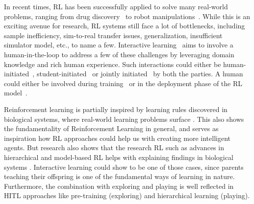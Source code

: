 \documentclass[twoside,11pt]{article}
\begin{document}
In recent times, RL has been successfully applied to solve many real-world problems, ranging from drug discovery~\citep{popova2018deep} to robot manipulations~\citep{nguyen2019review}. While this is an exciting avenue for research, RL systems still face a lot of bottlenecks, including sample inefficiency, sim-to-real transfer issues, generalization, insufficient simulator model, etc., to name a few. Interactive learning~\citep{Arzate:2020:SurveyInteractiveRL} aims to involve a human-in-the-loop to address a few of these challenges by leveraging domain knowledge and rich human experience. Such interactions could either be human-initiated~\citep{torrey2013teaching}, student-initiated~\citep{da2020uncertainty} or jointly initiated~\citep{amir2016interactive} by both the parties. A human could either be involved during training~\citep{Knox:2008:TAMER} or in the deployment phase of the RL model~\citep{guo2021edge}. 

Reinforcement learning is partially inspired by learning rules discovered in biological systems, where real-world learning problems surface \citep{NeftciAverbeck:2019:RLBiologicalSystems}. This also shows the fundamentality of Reinforcement Learning in general, and serves as inspiration how RL approaches could help us with creating more intelligent agents. But research also shows that the research RL such as advances in hierarchical and model-based RL helps with explaining findings in biological systems \citep{ShteingartLoewenstein:2014:RLHumanBehavior}. Interactive learning could show to be one of those cases, since parents teaching their offspring is one of the fundamental ways of learning in nature. Furthermore, the combination with exploring and playing is well reflected in HITL approaches like pre-training (exploring) and hierarchical learning (playing).

\end{document}
